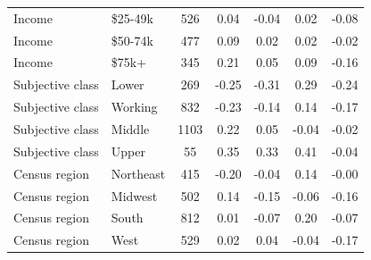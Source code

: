 \begin{tabular}{llccccc}
Income & \$25-49k & 526 & 0.04 & -0.04 & 0.02 & -0.08 \\
Income & \$50-74k & 477 & 0.09 & 0.02 & 0.02 & -0.02 \\
Income & \$75k+ & 345 & 0.21 & 0.05 & 0.09 & -0.16 \\
\addlinespace
Subjective class & Lower & 269 & -0.25 & -0.31 & 0.29 & -0.24 \\
Subjective class & Working & 832 & -0.23 & -0.14 & 0.14 & -0.17 \\
Subjective class & Middle & 1103 & 0.22 & 0.05 & -0.04 & -0.02 \\
Subjective class & Upper & 55 & 0.35 & 0.33 & 0.41 & -0.04 \\
\addlinespace
Census region & Northeast & 415 & -0.20 & -0.04 & 0.14 & -0.00 \\
Census region & Midwest & 502 & 0.14 & -0.15 & -0.06 & -0.16 \\
Census region & South & 812 & 0.01 & -0.07 & 0.20 & -0.07 \\
Census region & West & 529 & 0.02 & 0.04 & -0.04 & -0.17 \\
\bottomrule
\end{tabular}
